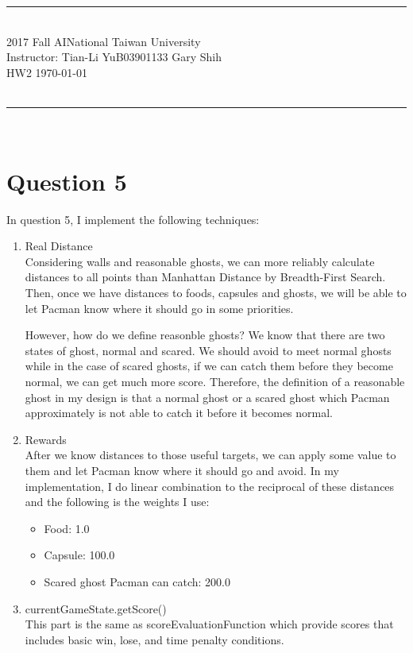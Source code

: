 \documentclass[12pt, a4paper]{article}
\begin{document}
{\bf \noindent
\rule[3pt]{\textwidth}{0.3pt}\\
2017 Fall AI\hfill National Taiwan University \\
Instructor: Tian-Li Yu\hfill B03901133 Gary Shih \\
HW2 \hfill \today\\
\vspace{-10pt} \\
\rule[3pt]{\textwidth}{1.3pt}\\
[-1cm]
}

\section*{Question 5}
In question 5, I implement the following techniques:
\begin{enumerate}
  \item Real Distance \\
    Considering walls and reasonable ghosts, we can more reliably calculate distances to all points
    than Manhattan Distance by Breadth-First Search. Then, once we have distances to foods, capsules
    and ghosts, we will be able to let Pacman know where it should go in some priorities. \par
    However, how do we define reasonble ghosts? We know that there are two states of ghost, normal
    and scared. We should avoid to meet normal ghosts while in the case of scared ghosts, if we can
    catch them before they become normal, we can get much more score. Therefore, the definition of a
    reasonable ghost in my design is that a normal ghost or a scared ghost which Pacman approximately
    is not able to catch it before it becomes normal.
  \item Rewards \\
    After we know distances to those useful targets, we can apply some value to them and let Pacman
    know where it should go and avoid. In my implementation, I do linear combination to the
    reciprocal of these distances and the following is the weights I use:
    \begin{itemize}
      \item Food: 1.0
      \item Capsule: 100.0
      \item Scared ghost Pacman can catch: 200.0
    \end{itemize}
  \item currentGameState.getScore() \\
    This part is the same as scoreEvaluationFunction which provide scores that includes basic win,
    lose, and time penalty conditions.
\end{enumerate}
\end{document}
